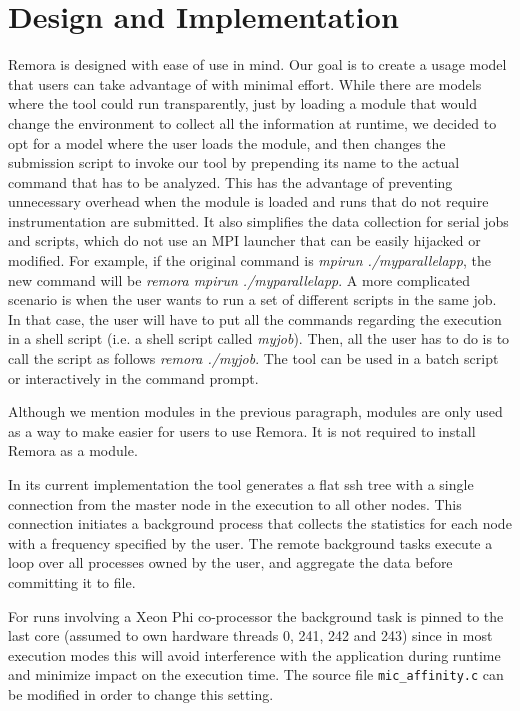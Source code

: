 \documentclass[10pt,a4paper]{report}
\begin{document}
\FloatBarrier
\chapter{Design and Implementation}
Remora is designed with ease of use in mind. Our goal is to create a usage model that users can take advantage of with minimal effort. While there are models where the tool could run transparently, just by loading a module that would change the environment to collect all the information at runtime, we decided to opt for a model where the user loads the module, and then changes the submission script to invoke our tool by prepending its name to the actual command that has to be analyzed. This has the advantage of preventing unnecessary overhead when the module is loaded and runs that do not require instrumentation are submitted. It also simplifies the data collection for serial jobs and scripts, which do not use an MPI launcher that can be easily hijacked or modified. For example, if the original command is \textit{mpirun ./myparallelapp}, the new command will be \textit{remora mpirun ./myparallelapp}. A more complicated scenario is when the user wants to run a set of different scripts in the same job. In that case, the user will have to put all the commands regarding the execution in a shell script (i.e. a shell script called \textit{myjob}). Then, all the user has to do is to call the script as follows \textit{remora ./myjob}. The tool can be used in a batch script or interactively in the command prompt.

Although we mention modules in the previous paragraph, modules are only used as a way to make easier for users to use Remora. It is not required to install Remora as a module.

In its current implementation the tool generates a flat ssh tree with a single connection from the master node in the execution to all other nodes. This connection initiates a background process that collects the statistics for each node with a frequency specified by the user. The remote background tasks execute a loop over all processes owned by the user, and aggregate the data before committing it to file.

For runs involving a Xeon Phi co-processor the background task is pinned to the last core (assumed to own hardware threads 0, 241, 242 and 243) since in most execution modes this will avoid interference with the application during runtime and minimize impact on the execution time. The source file \texttt{mic\_affinity.c} can be modified in order to change this setting.
\end{document}
